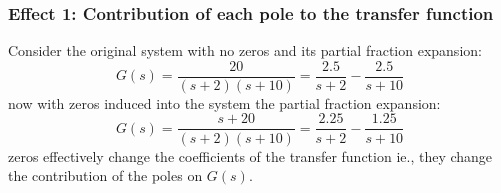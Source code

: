 \subsubsection{Effect 1: Contribution of each pole to the transfer function}
Consider the original system with no zeros and its partial fraction expansion:
\begin{equation}
	G(s) = \frac{20}{(s+2)(s+10)} = \frac{2.5}{s+2} - \frac{2.5}{s+10}
\end{equation}
now with zeros induced into the system the partial fraction expansion:
\begin{equation}
	G(s) = \frac{s+20}{(s+2)(s+10)} = \frac{2.25}{s+2} - \frac{1.25}{s+10}
\end{equation}
zeros effectively change the coefficients of the transfer function ie., they change the contribution of the poles on $G(s)$.
